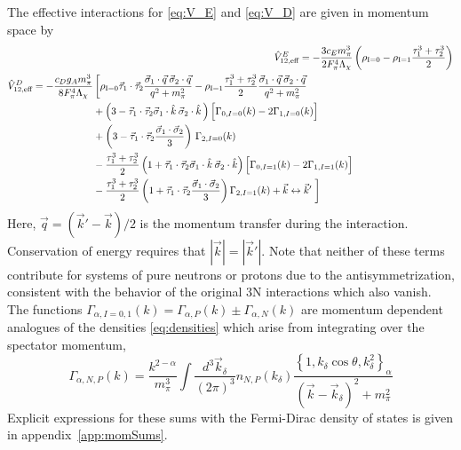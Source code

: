 \documentclass[%
 preprint,
 amsmath,amssymb,
 aps,
]{revtex4-1}
\newcommand{\veff}{\hat{V}_{12,\text{eff}}}
\newcommand{\rhozero}{\rho_{\text{I}=0}}
\newcommand{\rhoone}{\rho_{\text{I}=1}}
\newcommand{\taudot}{\vec{\tau}_1\cdot\vec{\tau}_2}
\newcommand{\tauplusthree}{\frac{\tau_1^3+\tau_2^3}{2}}
\newcommand{\sigmadot}{\vec{\sigma}_1\cdot\vec{\sigma}_2}
\newcommand{\fracphantom}{\vphantom{\frac{1}{1}}}
\begin{document}
 The effective interactions for \eqref{eq:V_E} and \eqref{eq:V_D} are given in momentum space by
 \begin{align}
 \veff^E=-\frac{3c_Em_\pi^3}{2F_\pi^4 \Lambda_\chi}&\left(\rhozero-\rhoone\tauplusthree\right)\\
 \begin{split}
 \veff^D=-\frac{c_Dg_A m_\pi^3}{8 F_\pi^4\Lambda_\chi}&\left[\rhozero\taudot \frac{\vec{\sigma}_1\cdot\vec{q}\:\vec{\sigma}_2\cdot\vec{q} }{q^2+m_\pi^2}  - \rhoone \tauplusthree\frac{\vec{\sigma}_1\cdot\vec{q}\:\vec{\sigma}_2\cdot\vec{q} }{q^2+m_\pi^2} \right. \\
&+ \left(3 -\taudot\vec{\sigma}_1\cdot\hat{k}\:\vec{\sigma}_2\cdot\hat{k}\, \right) \Big[\Gamma_{0,I=0}(k)-2 \Gamma_{1,I=0}(k)\Big] \\
&+  \left(3 -\taudot\frac{\sigmadot}{3} \right) \,\Gamma_{2,I=0}(k) \\
 &-\tauplusthree \left(1 +\taudot\vec{\sigma}_1\cdot\hat{k}\:\vec{\sigma}_2\cdot\hat{k} \right) \Big[\Gamma_{0,I=1}(k)-2 \Gamma_{1,I=1}(k)\Big] \\
 &-\tauplusthree  \left(1+\taudot\frac{\sigmadot}{3} \right) \Gamma_{2,I=1}(k)
+ \vec{k}\leftrightarrow\vec{k}'\left.\fracphantom\right]
 \end{split} 
 \end{align}
Here, $\vec{q}=(\vec{k}'-\vec{k})/2$ is the momentum transfer during the interaction. Conservation of energy requires that $|\vec{k}|=|\vec{k}'|$. Note that neither of these terms contribute for systems of pure neutrons or protons due to the antisymmetrization, consistent with the behavior of the original 3N interactions which also vanish. The functions $\Gamma_{\alpha,I=0,1}(k)=\Gamma_{\alpha,P}(k)\pm\Gamma_{\alpha,N}(k)$ are momentum dependent analogues of the densities \eqref{eq:densities} which arise from integrating over the spectator momentum,
\begin{equation}
\Gamma_{\alpha,N,P}(k) = \frac{k^{2-\alpha}}{m_\pi^3}\int\frac{d^3\vec{k}_\delta}{(2\pi)^3} n_{N,P}(k_\delta) \frac{\left\{1,k_\delta\cos\theta,k_\delta^2\right\}_\alpha}{(\vec{k}-\vec{k}_\delta)^2+m_\pi^2}
\end{equation}
Explicit expressions for these sums with the Fermi-Dirac density of states is given in appendix~\ref{app:momSums}.
\end{document}
